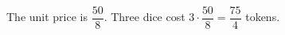 The unit price is $\dfrac{50}{8}$. Three dice cost $3\cdot\dfrac{50}{8}=\boxed{\dfrac{75}{4}}$ tokens.
